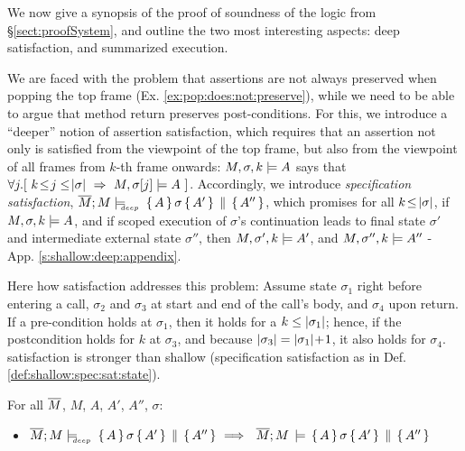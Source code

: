 We now give a synopsis of the proof of soundness of the logic from \S \ref{sect:proofSystem}, and outline the 
 two most interesting aspects: deep satisfaction, and summarized execution.

 
\label{s:scoped:valid}
We are faced with the problem that assertions are not always preserved when  popping the top frame (\cf Ex. \ref{ex:pop:does:not:preserve}), %
while we need to be able to argue that method return preserves post-conditions.
 For this, we introduce a  ``deeper'' notion of assertion satisfaction, which requires that an assertion not only is satisfied from the viewpoint of the top frame, but also from the viewpoint of all frames from $k$-th frame onwards:   $ M,\sigma ,{k} \models {A} $   says that   $\forall j. [\  k\!\leq\! j \leq\! |\sigma| \ \Rightarrow \ M, \sigma[j] \models A \ ]$.
Accordingly, we introduce \emph{\strong specification satisfaction},  ${\overline{M};M \models\!\!\!\!_{_{deep}}\  \, \{\, A\,\}\, \sigma\, \{\, A'\,\} \,\parallel\, \{\, A''\,\}  } $, which promises for all $k\!\leq\! |\sigma|$,  
if $ M,\sigma ,{k} \models {A} $, and    if %
  scoped execution of $\sigma$'s continuation leads to final state $\sigma'$ and intermediate external state $\sigma''$, then
 $ M,\sigma' ,{k} \models {A'} $, and  $ M,\sigma'' ,{k} \models {A''} $
 -  \cf  %
  App. \ref{s:shallow:deep:appendix}.
 
 Here how \strong satisfaction addresses this problem: Assume    state  $\sigma_1$  right before entering a call, $\sigma_2$ and $\sigma_3$ at start and end of the call's body, and   $\sigma_4$ upon return. If a  pre-condition holds at $\sigma_1$,  then it  holds for a $k\leq |\sigma_1|$; hence,  if the postcondition holds for $k$ at $\sigma_3$, and because $|\sigma_3|= |\sigma_1|\!+\!1$, it also holds for $\sigma_4$.    
%
\Strong satisfaction is stronger than shallow (\ie  specification satisfaction as in Def. \ref{def:shallow:spec:sat:state}). 
 
\begin{lemma}%
For all $\overline{M}$, $M$, $A$, $A'$, $A''$, $\sigma$:  
\begin{itemize}
\item
 $ {\overline{M};M \models\!\!\!\!_{_{deep}}\  \, \{\, A\,\}\, \sigma\, \{\, A'\,\} \,\parallel\, \{\, A''\,\}  } \ \Longrightarrow \ \
  {\overline{M}; M\, \models \, \{\, A\,\}\, \sigma \, \{\, A'\,\} \,\parallel\, \{\, A''\,\}  } $\end{itemize}
\end{lemma}


